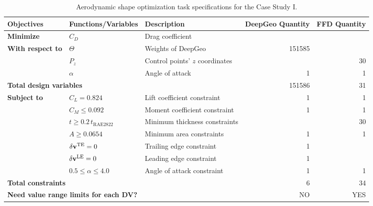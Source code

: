 \begin{table}[htb]
  \centering
  \caption{\small Aerodynamic shape optimization task specifications for the Case Study I.}
  \resizebox{0.95\columnwidth}{!} {
        \begin{tabular}{lllrr}
        \hline
        \multicolumn{1}{l}{\textbf{Objectives}} & \textbf{Functions/Variables} & \textbf{Description} & \multicolumn{1}{l}{\textbf{DeepGeo Quantity}} & \multicolumn{1}{l}{\textbf{FFD Quantity}} \\
        \hline
        \multicolumn{1}{l}{\textbf{Minimize}} & $C_D$  & Drag coefficient &        &  \\
        \hline
        \multicolumn{1}{l}{\multirow{3}[2]{*}{\textbf{With respect to}}} & $\Theta$ & Weights of DeepGeo & \num{151585} &         \\
        \multicolumn{1}{l}{} & $P_z$  & Control points' $z$ coordinates &        & 30 \\
        \multicolumn{1}{l}{} & $\alpha$ & Angle of attack & 1      & 1 \\
        \hline
        \multicolumn{3}{l}{\textbf{Total design variables}} & \num{151586} & 31 \\
        \hline
        \multicolumn{1}{l}{\multirow{6}[2]{*}{\textbf{Subject to}}} & $C_L=0.824$ & Lift coefficient constraint & 1      & 1 \\
        \multicolumn{1}{r}{} & $C_M\leq0.092$ & Moment coefficient constraint & 1      & 1 \\
        \multicolumn{1}{r}{} & $t \ge 0.2\,t_\text{RAE2822}$ & Minimum thickness constraints &        & 30 \\
        \multicolumn{1}{r}{} & $A \ge 0.0654$ & Minimum area constraints &   1    &  1 \\
        \multicolumn{1}{r}{} & $\delta \mathbf{v}^\text{TE}=0$ & Trailing edge constraint & 1      &  \\
        \multicolumn{1}{r}{} & $\delta \mathbf{v}^\text{LE}=0$ & Leading edge constraint & 1      &  \\
        \multicolumn{1}{r}{} & $0.5 \leq \alpha \leq 4.0$ & Angle of attack constraint & 1      &  1 \\
        \hline
        \multicolumn{3}{l}{\textbf{Total constraints}} & 6      & 34 \\
        \hline
        \multicolumn{3}{l}{\textbf{Need value range limits for each DV?}} & NO     & YES \\
        \hline
        \end{tabular}%
    }
  \label{ch5:tab:circle_2_airfoil_DV_cons}%
\end{table}%
